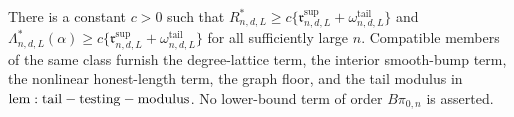 There is a constant \(c>0\) such that \(R^*_{n,d,L}\ge c\{\mathfrak r^{\mathrm{sup}}_{n,d,L}+\omega^{\mathrm{tail}}_{n,d,L}\}\) and \(\Lambda^*_{n,d,L}(\alpha)\ge c\{\mathfrak r^{\mathrm{sup}}_{n,d,L}+\omega^{\mathrm{tail}}_{n,d,L}\}\) for all sufficiently large \(n\). Compatible members of the same class furnish the degree-lattice term, the interior smooth-bump term, the nonlinear honest-length term, the graph floor, and the tail modulus in \({\rm lem:tail-testing-modulus}\). No lower-bound term of order \(B\pi_{0,n}\) is asserted.